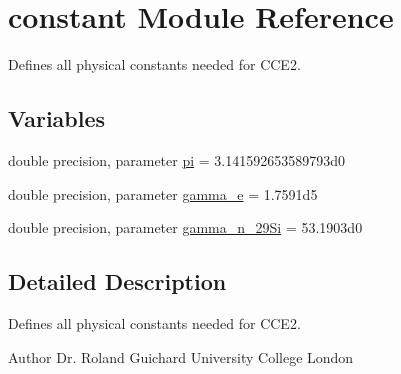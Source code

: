 \hypertarget{namespaceconstant}{
\section{constant Module Reference}
\label{namespaceconstant}
}


Defines all physical constants needed for CCE2.  
\subsection*{Variables}
\begin{DoxyCompactItemize}
\item 
double precision, parameter \hyperlink{namespaceconstant_ae6f370ef8cc1a7c38a6ddf8505ac480d}{pi} = 3.141592653589793d0
\item 
double precision, parameter \hyperlink{namespaceconstant_ad70145ef05b91abf89de0761cb859778}{gamma\_\-e} = 1.7591d5
\item 
double precision, parameter \hyperlink{namespaceconstant_aed9a4589c9352f948ca62e1499046b8c}{gamma\_\-n\_\-29Si} = 53.1903d0
\end{DoxyCompactItemize}


\subsection{Detailed Description}
Defines all physical constants needed for CCE2. \begin{DoxyAuthor}{Author}
Dr. Roland Guichard University College London 
\end{DoxyAuthor}


